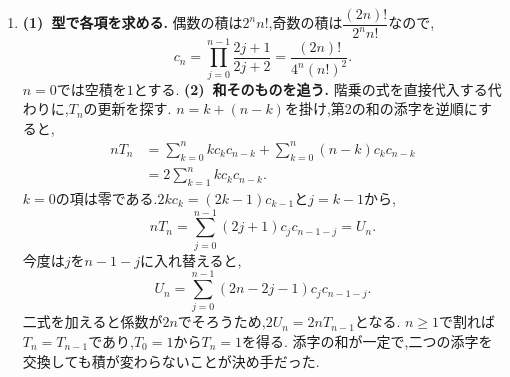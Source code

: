 \begin{enumerate}[label=\textbf{問\arabic*.},leftmargin=3.8em,format=\bookitemlink{practice-entrance}{solution}{problem}]
\[                    3^m(a_0+1)=2^m(a_m+1)
                  \]
                  の右辺は$2^{m+1}$で割り切れる.$3^m$と互いに素なので,
                  $a_0=2^{m+1}\ell-1$（$\ell$は正整数）が必要である.
                  逆にこの初項から,
                  \[
                    b_j=3^j2^{m+1-j}\ell-1\quad(0\le j\le m)
                  \]
                  とおくと,すべて正の奇数で,$b_0=a_0$かつ$\dfrac{3b_j+1}{2}=b_{j+1}$（$0\le j<m$）である.
                  実際に奇数の分岐で進むため$a_j=b_j$となり,十分性も示せた.
                  最小値は$\ell=1$の$2^{m+1}-1$である.
                  \smallskip\textbf{(3)~奇数区間の長さ.}
                  $s=0$なら初項が偶数なので答えは$0$である.
                  $s\ge1$なら,同じ確認から
                  \[
                    a_j=3^j2^{s-j}t-1\quad(0\le j\le s)
                  \]
                  となる.$j<s$では奇数,$j=s$では偶数なので連続する奇数項は$s$個である.
                  例えば$a_0=7$では$7,11,17,26,\ldots$となる.
                  最初の奇数区間の長さは,$a_0+1$に含まれる$2$の因子で決まる.
          \item \textbf{(1)~型で各項を求める.}
                  偶数の積は$2^nn!$,奇数の積は$\dfrac{(2n)!}{2^nn!}$なので,
                  \[
                    c_n=\prod_{j=0}^{n-1}\frac{2j+1}{2j+2}
                       =\frac{(2n)!}{4^n(n!)^2}.
                  \]
                  $n=0$では空積を$1$とする.
                  \smallskip\textbf{(2)~和そのものを追う.}
                  階乗の式を直接代入する代わりに,$T_n$の更新を探す.
                  $n=k+(n-k)$を掛け,第2の和の添字を逆順にすると,
                  \[
                  \begin{aligned}
                    nT_n&=\sum_{k=0}^n kc_kc_{n-k}
                          +\sum_{k=0}^n(n-k)c_kc_{n-k}\\
                        &=2\sum_{k=1}^n kc_kc_{n-k}.
                  \end{aligned}
                  \]
                  $k=0$の項は零である.$2kc_k=(2k-1)c_{k-1}$と$j=k-1$から,
                  \[
                    nT_n=\sum_{j=0}^{n-1}(2j+1)c_jc_{n-1-j}=U_n.
                  \]
                  今度は$j$を$n-1-j$に入れ替えると,
                  \[
                    U_n=\sum_{j=0}^{n-1}(2n-2j-1)c_jc_{n-1-j}.
                  \]
                  二式を加えると係数が$2n$でそろうため,$2U_n=2nT_{n-1}$となる.
                  $n\ge1$で割れば$T_n=T_{n-1}$であり,$T_0=1$から$T_n=1$を得る.
                  添字の和が一定で,二つの添字を交換しても積が変わらないことが決め手だった.

\end{enumerate}
